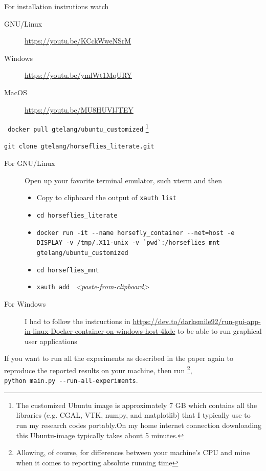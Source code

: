 \documentclass[11.5pt]{report}
\begin{document}
\begin{alphalist}
\item {} For installation instrutions watch
  \begin{description}
    \item[GNU/Linux]  \url{https://youtu.be/KCckWweNSrM}
    \item[Windows]    \url{https://youtu.be/ymlWt1MqURY}
    \item[MacOS]      \url{https://youtu.be/MU8HUVlJTEY}
  \end{description}

\item {} \verb| docker pull gtelang/ubuntu_customized| \footnote{The customized Ubuntu image is approximately
  7 GB which contains all the libraries (e.g. CGAL, VTK, numpy, and matplotlib) that I typically use to run 
  my research codes portably.On my home internet connection downloading this Ubuntu-image typically takes about 5 minutes. }
\item {} \verb|git clone gtelang/horseflies_literate.git|
\item {} 
\begin{description}
\item[For GNU/Linux] Open up your favorite terminal emulator, such xterm and then
{\small
\begin{itemize}
   \item Copy to clipboard the output of \verb|xauth list|
   \item \verb|cd horseflies_literate|
   \item \verb|docker run -it --name horsefly_container --net=host -e DISPLAY -v /tmp/.X11-unix -v `pwd`:/horseflies_mnt gtelang/ubuntu_customized|
   \item \verb|cd horseflies_mnt| 
   \item \verb|xauth add | \textit{<paste-from-clipboard>}
\end{itemize}}
\item[For Windows] I had to follow the instructions in 
      \url{https://dev.to/darksmile92/run-gui-app-in-linux-Docker-container-on-windows-host-4kde} to be 
      able to run graphical user applications
\end{description}

\item {} If you want to run all the experiments as described in 
  the paper again to reproduce the reported results on your machine, then run \footnote{ Allowing, of course,
  for differences between your machine's CPU and mine when it comes to reporting absolute running time}, \\
  \verb|python main.py --run-all-experiments|. 


\end{alphalist}
\end{document}
